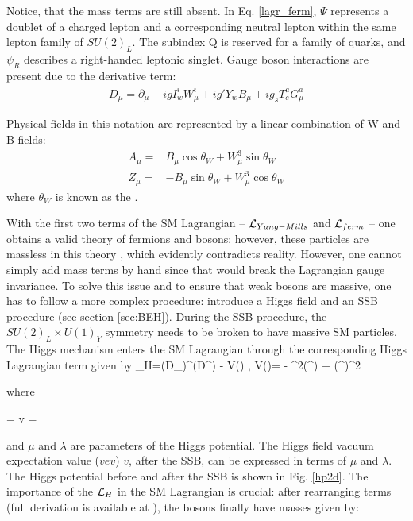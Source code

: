 \noindent Notice, that the mass terms are still absent. In Eq. \ref{lagr_ferm}, $\Psi$ represents a doublet of a charged lepton and a corresponding neutral lepton within the same lepton family of \textit{$SU(2)_L$}. The subindex Q is reserved for a family of quarks, and $\psi_R$ describes a right-handed leptonic singlet.  Gauge boson interactions are present due to the derivative term:
\begin{align}\label{cov_der2}
D_\mu = \partial_\mu + ig I_w^i W_\mu^i+ ig' Y_w B_\mu + ig_s T_c^a G_\mu^a
\end{align}

\noindent Physical fields in this notation are represented by a linear combination of W and B fields:
\begin{align}\label{neutral_fields}
A_\mu = &  B_\mu \cos\theta_W + W^3_\mu \sin\theta_W \\ 
Z_\mu = & -B_\mu \sin\theta_W + W^3_\mu \cos\theta_W \nonumber 
\end{align}
\noindent where $\theta_W$ is known as the  \cite{Weinberg:799984}.

With the first two terms of the SM Lagrangian --  $\mathcal{L}_{Yang-Mills}$ and $\mathcal{L}_{ferm}$ -- one obtains a valid theory of fermions and bosons; however, these particles are massless in this theory \cite{Wolf:2015kua}, which evidently contradicts reality. However, one cannot simply add mass terms by hand since that would break the Lagrangian gauge invariance. To solve this issue and to ensure that weak bosons are massive, one has to follow a more complex procedure: introduce a Higgs field and an SSB procedure (see section \ref{sec:BEH}). During the SSB procedure, the $SU(2)_L \times U(1)_Y$ symmetry needs to be broken to have massive SM particles. The Higgs mechanism enters the SM Lagrangian through the corresponding Higgs Lagrangian term given by 
\beqn\label{lagr_higgs}
\Lagr_H=(D_\mu\Phi)^\dagger(D^\mu\Phi) - V(\Phi) , \qquad V(\Phi)= - \mu^2(\Phi^\dagger\Phi) + (\Phi^\dagger\Phi)^2
\eeqn

\noindent where

\beqn\label{vev}
\Phi =  \quad {} \quad v =  
\eeqn

\noindent and $\mu$ and $\lambda$ are parameters of the Higgs potential. The Higgs field vacuum expectation value ($vev$) $v$, after the SSB, can be expressed in terms of $\mu$ and $\lambda$. The Higgs potential before and after the SSB is shown in Fig. \ref{hp2d}. The importance of the $\mathcal{L}_H$ in the SM Lagrangian is crucial: after rearranging terms (full derivation is available at \cite{Halzen:100339, Zee_qft}), the bosons finally have masses given by:

